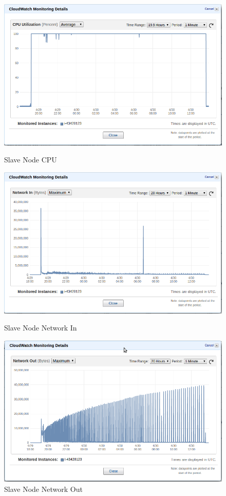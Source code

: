 \begin{figure}[!htb]
  \includegraphics[width=\linewidth]{pics/slave_cpu.png}
  \caption{Slave Node CPU}\label{fig:slave_cpu}
\endminipage\hfill
{}
  \includegraphics[width=\linewidth]{pics/slave_network_in.png}
  \caption{Slave Node Network In}\label{fig:slave_in}
\endminipage\hfill
{}
  \includegraphics[width=\linewidth]{pics/slave_network_out.png}
  \caption{Slave Node Network Out}\label{fig:slave_out}
\endminipage\hfill
\end{figure}

